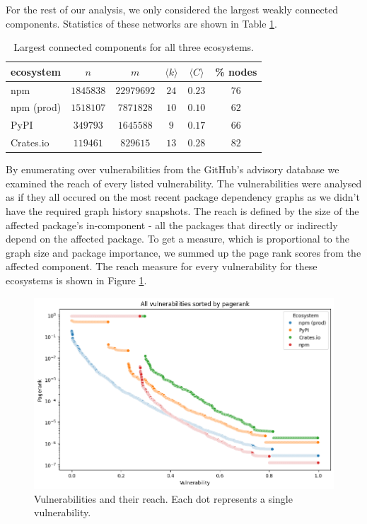 \documentclass[9pt,twocolumn,twoside]{pnas-report}
\begin{document}
For the rest of our analysis, we only considered the largest weakly connected components.
Statistics of these networks are shown in Table \ref{tab:lcc_stats}.

\begin{table}[h]\centering%
	\caption{Largest connected components for all three ecosystems.}
	\begin{tabular}{l|ccccc}
		ecosystem  & $n$       & $m$        & $\langle k\rangle$ & $\langle C\rangle$ & \% nodes \\\hline
		npm        & $1845838$ & $22979692$ & $24$               & $0.23$             & $76$     \\
		npm (prod) & $1518107$ & $7871828$  & $10$               & $0.10$             & $62$     \\
		PyPI       & $349793$  & $1645588$  & $9$                & $0.17$             & $66$     \\
		Crates.io  & $119461$  & $829615$   & $13$               & $0.28$             & $82$     \\
	\end{tabular}
	\label{tab:lcc_stats}
\end{table}

By enumerating over vulnerabilities from the GitHub's advisory database we examined the reach of every listed vulnerability.
The vulnerabilities were analysed as if they all occured on the most recent package dependency graphs as we didn't have the required graph history snapshots.
The reach is defined by the size of the affected package's in-component - all the packages that directly or indirectly depend on the affected package.
To get a measure, which is proportional to the graph size and package importance, we summed up the page rank scores from the affected component.
The reach measure for every vulnerability for these ecosystems is shown in Figure \ref{fig:reach}.

\begin{figure}[t]\centering%
	\includegraphics[width=\linewidth]{vulns_pagerank.png}
	\caption{Vulnerabilities and their reach. Each dot represents a single vulnerability. }
	\label{fig:reach}
\end{figure}
\end{document}

